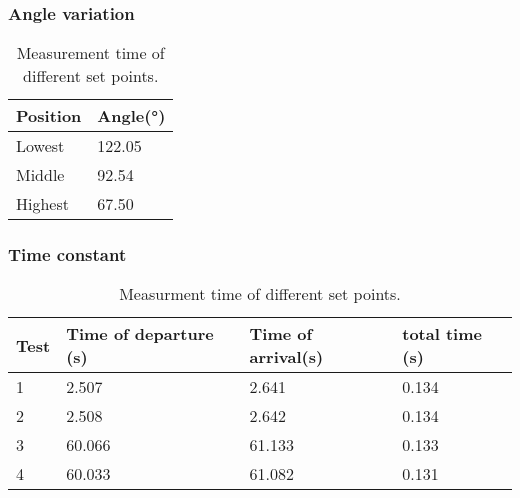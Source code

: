 		\subsubsection*{Angle variation}


\begin{table}[htbp]
	\centering
	\caption{Measurement time of different set points.}
	\label{tab:AngleData}
	\begin{tabularx}{\textwidth}{lX} 
		Position & Angle{(}°{)}  \\ \toprule
		Lowest & 122.05  \\ \rowcolor{lightGrey}
		Middle & 92.54  \\ 
		Highest & 67.50  \\
	\end{tabularx}
\end{table}
		
		
		
	
		\subsubsection*{Time constant}

\begin{table}[htbp]
	\centering
	\caption{Measurment time of different set points.}
	\label{tab:TimeData}
	\begin{tabularx}{\textwidth}{lXXX} 
		Test & Time of departure {(}s{)}& Time of arrival{(}s{)} & total time {(}s{)} \\  \toprule 
		1     & 2.507              & 2.641             & 0.134                     \\   \rowcolor{lightGrey}
		2     & 2.508              & 2.642 & 0.134                                 \\
		3     & 60.066              & 61.133 & 0.133                                 \\ \rowcolor{lightGrey}
		4     & 60.033             & 61.082            & 0.131                    \\ 
	\end{tabularx}
\end{table}
				

